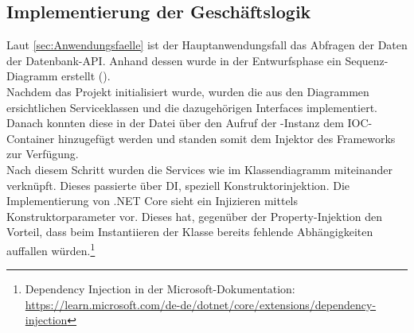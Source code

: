 \subsection{Implementierung der Geschäftslogik}
\label{sec:ImplementierungGeschaeftslogik}
Laut \ref{sec:Anwendungsfaelle}  ist der Hauptanwendungsfall
das Abfragen der Daten der Datenbank-\acs{API}. Anhand dessen wurde in der Entwurfsphase ein
Sequenz-Diagramm erstellt (\Vgl {}).\\
Nachdem das Projekt initialisiert wurde, wurden die aus den Diagrammen ersichtlichen Serviceklassen
und die dazugehörigen Interfaces implementiert. Danach konnten diese in der Datei 
über den Aufruf  der -Instanz dem \acs{IOC}-Container 
hinzugefügt werden und standen somit dem Injektor des Frameworks zur Verfügung. \\Nach diesem Schritt 
wurden die Services wie im Klassendiagramm  miteinander verknüpft.
Dieses passierte über \acs{DI}, speziell Konstruktorinjektion. Die Implementierung von .NET Core 
sieht ein Injizieren mittels Konstruktorparameter vor. Dieses hat, gegenüber der Property-Injektion 
den Vorteil, dass beim Instantiieren der Klasse bereits fehlende Abhängigkeiten auffallen würden.\footnote{Dependency Injection in der Microsoft-Dokumentation:\\ 
\url{https://learn.microsoft.com/de-de/dotnet/core/extensions/dependency-injection}}\\

